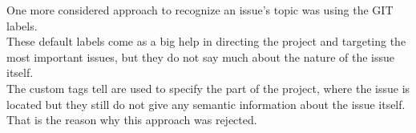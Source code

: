 One more considered approach to recognize an issue's topic was using the GIT labels. \\
These default labels come as a big help in directing the project and targeting the most important issues, but they do not say much about the nature of the issue itself.\\
The custom tags tell are used to specify the part of the project, where the issue is located but they still do not give any semantic information about the issue itself. That is the reason why this approach was rejected. 
